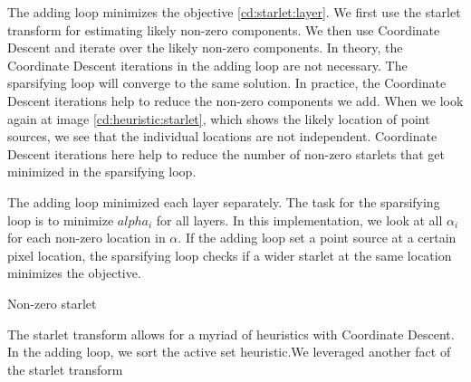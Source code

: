 The adding loop minimizes the objective \eqref{cd:starlet:layer}. We first use the starlet transform for estimating likely non-zero components. We then use Coordinate Descent and iterate over the likely non-zero components. In theory, the Coordinate Descent iterations in the adding loop are not necessary. The sparsifying loop will converge to the same solution. In practice, the Coordinate Descent iterations help to reduce the non-zero components we add. When we look again at image \ref{cd:heuristic:starlet}, which shows the likely location of point sources, we see that the individual locations are not independent. Coordinate Descent iterations here help to reduce the number of non-zero starlets that get minimized in the sparsifying loop.

The adding loop minimized each layer separately. The task for the sparsifying loop is to minimize $alpha_i$ for all layers. In this implementation, we look at all $\alpha_i$ for each non-zero location in $\alpha$. If the adding loop set a point source at a certain pixel location, the sparsifying loop checks if a wider starlet at the same location minimizes the objective.

Non-zero starlet

The starlet transform allows for a myriad of heuristics with Coordinate Descent. In the adding loop, we sort the active set heuristic.We leveraged another fact of the starlet transform 







